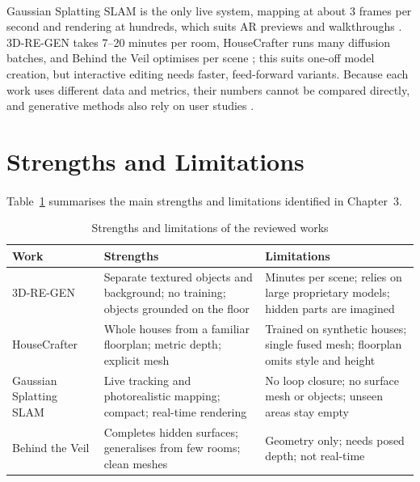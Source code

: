 \documentclass[12pt,a4paper,final]{extreport}
\begin{document}
\paragraph{} Gaussian Splatting SLAM is the only live system, mapping at about 3 frames per second and rendering at hundreds, which suits AR previews and walkthroughs \cite{p3}. 3D-RE-GEN takes 7--20 minutes per room, HouseCrafter runs many diffusion batches, and Behind the Veil optimises per scene \cite{p1,p2,p4}; this suits one-off model creation, but interactive editing needs faster, feed-forward variants. Because each work uses different data and metrics, their numbers cannot be compared directly, and generative methods also rely on user studies \cite{p1,p2}.

\section{Strengths and Limitations}

\paragraph{} Table~\ref{tab:strength_limit} summarises the main strengths and limitations identified in Chapter~3.

{\renewcommand{\arraystretch}{1.15}
\begin{table}[htbp]
\centering
\caption{Strengths and limitations of the reviewed works}\label{tab:strength_limit}
\small
\begin{tabularx}{\textwidth}{|p{2.5cm}|X|X|}
\hline
\textbf{Work} & \textbf{Strengths} & \textbf{Limitations} \\ \hline
3D-RE-GEN & Separate textured objects and background; no training; objects grounded on the floor & Minutes per scene; relies on large proprietary models; hidden parts are imagined \\ \hline
HouseCrafter & Whole houses from a familiar floorplan; metric depth; explicit mesh & Trained on synthetic houses; single fused mesh; floorplan omits style and height \\ \hline
Gaussian Splatting SLAM & Live tracking and photorealistic mapping; compact; real-time rendering & No loop closure; no surface mesh or objects; unseen areas stay empty \\ \hline
Behind the Veil & Completes hidden surfaces; generalises from few rooms; clean meshes & Geometry only; needs posed depth; not real-time \\ \hline
\end{tabularx}
\end{table}}
\end{document}

